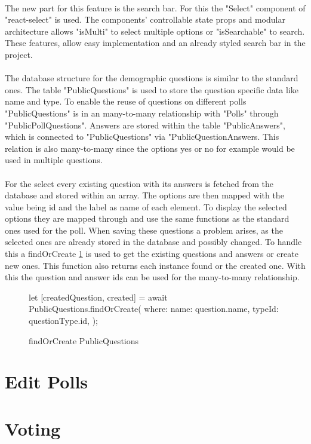 \documentclass[a4paper,12pt]{report}
\begin{document}
\\
The new part for this feature is the search bar. For this the "Select" component of "react-select" is used. The components' controllable state props and modular architecture allows  "isMulti" to select multiple options or "isSearchable" to search. These features, allow easy implementation and an already styled search bar in the project. \parencite{reactselect}
\\ \\
The database structure for the demographic questions is similar to the standard ones. The table "PublicQuestions" is used to store the question specific data like name and type. To enable the reuse of questions on different polls "PublicQuestions" is in an many-to-many relationship with "Polls" through "PublicPollQuestions". Answers are stored within the table "PublicAnswers", which is connected to "PublicQuestions" via "PublicQuestionAnswers. This relation is also many-to-many since the options yes or no for example would be used in multiple questions. 
\\ \\
For the select every existing question with its answers is fetched from the database and stored within an array. The options are then mapped with the value being id and the label as name of each element. To display the selected options they are mapped through and use the same functions as the standard ones used for the poll. When saving these questions a problem arises, as the selected ones are already stored in the database and possibly changed. To handle this a findOrCreate \ref{fig:publicQuestions} is used to get the existing questions and answers or create new ones. This function also returns each instance found or the created one. With this the question and answer ids can be used for the many-to-many relationship. \parencite{sequelizedoku} 
\begin{figure}[h!]
\begin{code}
let [createdQuestion, created] = await PublicQuestions.findOrCreate({
	where: {
		name: question.name,
		typeId: questionType.id,
	}
});
\end{code}
	\caption{findOrCreate PublicQuestions}
	\label{fig:publicQuestions}
\end{figure}

\section{Edit Polls}
\section{Voting}
\end{document}
